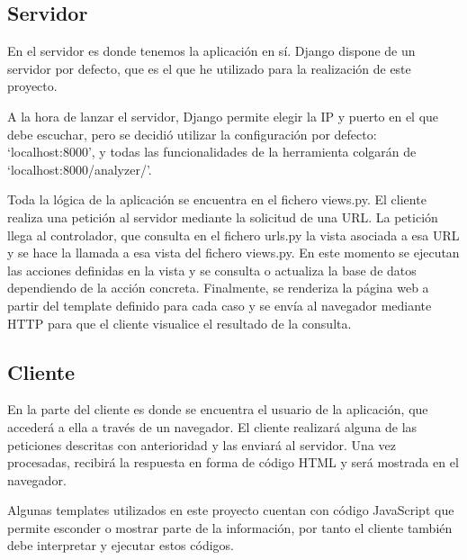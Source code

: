 \documentclass[a4paper, 12pt]{book}
\begin{document}
\subsection{Servidor}
\label{sec:seccion11.1}
En el servidor es donde tenemos la aplicación en sí. Django dispone de un servidor por defecto, que es el que he utilizado para la realización de este proyecto.

A la hora de lanzar el servidor, Django permite elegir la IP y puerto en el que debe escuchar, pero se decidió utilizar la configuración por defecto: `localhost:8000', y todas las funcionalidades de la herramienta colgarán de `localhost:8000/analyzer/'.

Toda la lógica de la aplicación se encuentra en el fichero views.py. El cliente realiza una petición al servidor mediante la solicitud de una URL. La petición llega al controlador, que consulta en el fichero urls.py la vista asociada a esa URL y se hace la llamada a esa vista del fichero views.py. En este momento se ejecutan las acciones definidas en la vista y se consulta o actualiza la base de datos dependiendo de la acción concreta. Finalmente, se renderiza la página web a partir del template definido para cada caso y se envía al navegador mediante HTTP para que el cliente visualice el resultado de la consulta.


\subsection{Cliente}
\label{sec:seccion11.2}
En la parte del cliente es donde se encuentra el usuario de la aplicación, que accederá a ella a través de un navegador. El cliente realizará alguna de las peticiones descritas con anterioridad y las enviará al servidor. Una vez procesadas, recibirá la respuesta en forma de código HTML y será mostrada en el navegador.

Algunas templates utilizados en este proyecto cuentan con código JavaScript que permite esconder o mostrar parte de la información, por tanto el cliente también debe interpretar y ejecutar estos códigos.
\end{document}
